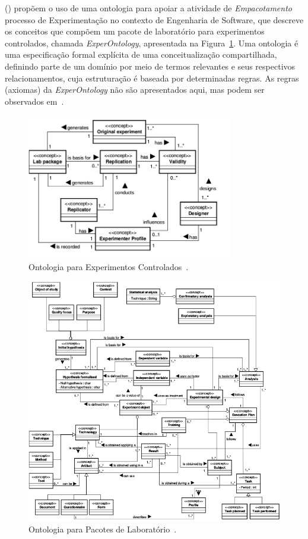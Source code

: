  (\citeyear{Garcia08}) propõem o uso de uma ontologia para apoiar a atividade de \textit{Empacotamento} processo de Experimentação no contexto de Engenharia de Software, que descreve os conceitos que compõem um pacote de laboratório para experimentos controlados, chamada \textit{ExperOntology}, apresentada na Figura~\ref{fig:onto01}.
Uma ontologia é uma especificação formal explícita de uma conceitualização compartilhada, definindo parte de um domínio por meio de termos relevantes e seus respectivos relacionamentos, cuja estruturação é baseada por determinadas regras. As regras (axiomas) da \textit{ExperOntology} não são apresentados aqui, mas podem ser observados em~\cite{Garcia08}.
\begin{figure}[!ht]
\centering
\includegraphics[width=0.8\textwidth]{images/controlados.png}
\caption{Ontologia para Experimentos Controlados~\cite{Garcia08}.}\label{fig:onto01}
\end{figure}

\begin{figure}[!htb]
\centering
\includegraphics[width=\textwidth]{images/onto.png}
\caption{Ontologia para Pacotes de Laboratório~\cite{Garcia08}.}\label{fig:onto02}
\end{figure}

